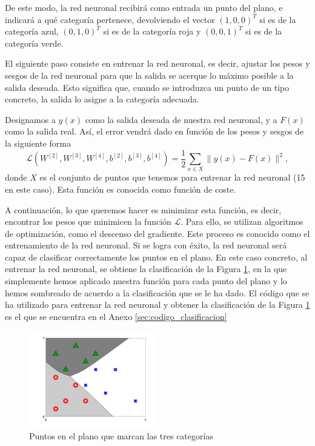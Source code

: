 \documentclass[a4paper,11pt,spanish, twoside, leqno]{tfg-uam}
\theoremstyle{definition}
\begin{document}
De este modo, la red neuronal recibirá como entrada un punto del plano, e indicará a qué categoría pertenece, devolviendo el vector $(1,0,0)^T$ si es de la categoría azul, $(0,1,0)^T$ si es de la categoría roja y $(0,0,1)^T$ si es de la categoría verde.

El siguiente paso consiste en entrenar la red neuronal, es decir, ajustar los pesos y sesgos de la red neuronal para que la salida se acerque lo máximo posible a la salida deseada. Esto significa que, cuando se introduzca un punto de un tipo concreto, la salida lo asigne a la categoría adecuada. 

Designamos a $y(x)$ como la salida deseada de nuestra red neuronal, y a $F(x)$ como la salida real. Así, el error vendrá dado en función de los pesos y sesgos de la siguiente forma
\begin{equation*}
    \mathcal{L}(W^{[2]},W^{[3]},W^{[4]},b^{[2]},b^{[3]},b^{[4]})=\frac{1}{2}\sum_{x\in X}\|y(x)-F(x)\|^2,
\end{equation*}
donde $X$ es el conjunto de puntos que tenemos para entrenar la red neuronal (15 en este caso). Esta función es conocida como función de coste.

A continuación, lo que queremos hacer es minimizar esta función, es decir, encontrar los pesos que minimicen la función $\mathcal{L}$. Para ello, se utilizan algoritmos de optimización, como el descenso del gradiente. Este proceso es conocido como el entrenamiento de la red neuronal. Si se logra con éxito, la red neuronal será capaz de clasificar correctamente los puntos en el plano. En este caso concreto, al entrenar la red neuronal, se obtiene la clasificación de la Figura \ref{fig:ClasificacionFinal}, en la que simplemente hemos aplicado nuestra función para cada punto del plano y lo hemos sombreado de acuerdo a la clasificación que se le ha dado. El código que se ha utilizado para entrenar la red neuronal y obtener la clasificación de la Figura \ref{fig:ClasificacionFinal} es el que se encuentra en el Anexo \ref{sec:codigo_clasificacion}

\begin{figure}
    \centering
    \includegraphics[width=0.5\textwidth]{Figuras/classifier_back.png}
    \caption{Puntos en el plano que marcan las tres categorías}
    \label{fig:ClasificacionFinal}
\end{figure}
\end{document}
